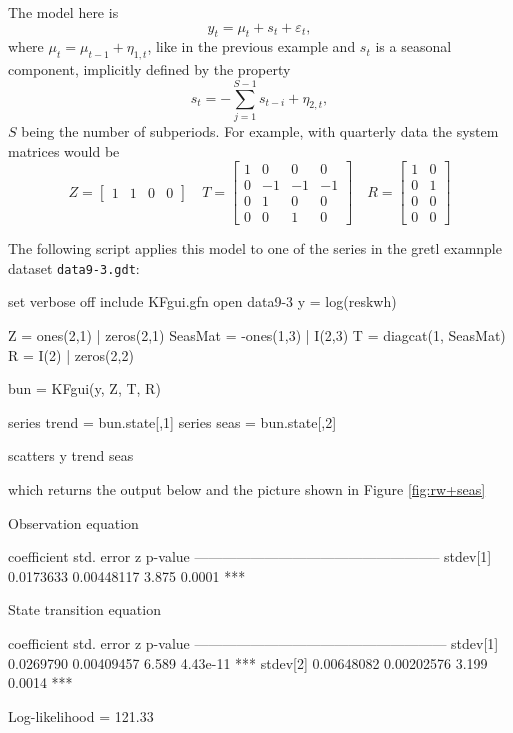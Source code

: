 \documentclass[a4paper]{article}
\begin{document}
The model here is
\[
  y_t = \mu_t + s_t + \varepsilon_t,
\]
where $\mu_t = \mu_{t-1} + \eta_{1,t}$, like in the previous example
and $s_t$ is a seasonal component, implicitly defined by the property
\[
  s_t = -\sum_{j=1}^{S-1} s_{t-i} + \eta_{2,t},
\]
$S$ being the number of subperiods. For example, with quarterly data
the system matrices would be
\[
  Z = \begin{bmatrix}  1 & 1 & 0 & 0  \end{bmatrix}
  \quad
  T = \begin{bmatrix}
    1 & 0 & 0 & 0 \\
    0 & -1 & -1 & -1 \\
    0 & 1 & 0 & 0 \\
    0 & 0 & 1 & 0
  \end{bmatrix}
  \quad
  R = \begin{bmatrix}  1 & 0 \\ 0 & 1 \\ 0 & 0 \\ 0 & 0   \end{bmatrix}
\]

The following script applies this model to one of the series in the
gretl examnple dataset \texttt{data9-3.gdt}:

\begin{code}
set verbose off
include KFgui.gfn
open data9-3
y = log(reskwh)

Z = ones(2,1) | zeros(2,1)
SeasMat = -ones(1,3) | I(2,3)
T = diagcat(1, SeasMat)
R = I(2) | zeros(2,2)

bun = KFgui(y, Z, T, R)

series trend = bun.state[,1]
series seas = bun.state[,2]

scatters y trend seas
\end{code}

which returns the output below and the picture shown in Figure
\ref{fig:rw+seas}

\begin{code}

Observation equation

             coefficient   std. error     z     p-value
  -----------------------------------------------------
  stdev[1]    0.0173633    0.00448117   3.875   0.0001  ***


State transition equation

             coefficient   std. error     z     p-value 
  ------------------------------------------------------
  stdev[1]   0.0269790     0.00409457   6.589   4.43e-11 ***
  stdev[2]   0.00648082    0.00202576   3.199   0.0014   ***

  Log-likelihood = 121.33
\end{code}
\end{document}
